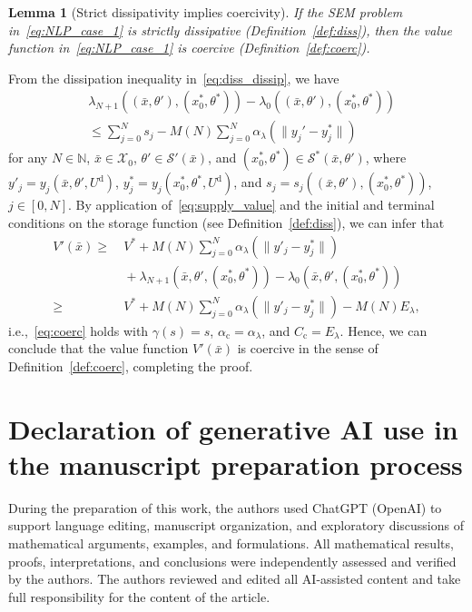 \documentclass[a4paper,fleqn]{cas-dc}
\newtheorem{lem}{Lemma}
\begin{document}
\begin{lem}[Strict dissipativity implies coercivity]\label{lem:diss2coerc}
	If the SEM problem in~\eqref{eq:NLP_case_1} is strictly dissipative (Definition~\ref{def:diss}), then the value function in~\eqref{eq:NLP_case_1} is coercive (Definition~\ref{def:coerc}).
\end{lem}
\begin{pf}
	From the dissipation inequality in~\eqref{eq:diss_dissip}, we have
	\begin{equation*}
		\begin{split}
			&\lambda_{N+1}((\bar{x},\theta'),(x^*_0,\theta^*)) -  \lambda_0((\bar{x},\theta'),(x^*_0,\theta^*)) \nonumber \\
			&\leq \sum_{j=0}^{N}s_j -  M(N)\sum_{j=0}^{N}\alpha_\lambda(\|y_j'-y_j^*\|)
		\end{split}
	\end{equation*}
	for any $N\in\mathbb{N}$, $\bar{x}\in\mathcal{X}_0$, $\theta'\in\mathcal{S}'(\bar{x})$, and $(x_0^*,\theta^*)\in\mathcal{S}^*(\bar{x},\theta')$, where $y'_j=y_j(\bar{x},\theta',U^\mathrm{d})$, $y^*_j=y_j(x_0^*,\theta^*,U^\mathrm{d})$, and $s_j = s_j((\bar{x},\theta'),(x_0^*,\theta^*))$, $j\in[0,N]$.
	By application of~\eqref{eq:supply_value} and the initial and terminal conditions on the storage function (see Definition~\ref{def:diss}), we can infer that
	\begin{align*}
		V'(\bar{x})
		\geq&\ V^* +  M(N)\sum_{j=0}^N \alpha_\lambda(\|y'_j-y^*_j\|) \\
		&\ +  \lambda_{N+1}(\bar{x},\theta',(x^*_0,\theta^*)) - \lambda_0(\bar{x},\theta',(x^*_0,\theta^*))\\
		\geq&\ V^* +  M(N)\sum_{j=0}^N \alpha_\lambda(\|y'_j-y^*_j\|) - M(N) E_\lambda,
	\end{align*}
	i.e.,~\eqref{eq:coerc} holds with $\gamma(s) = s$, $\alpha_\mathrm{c} = \alpha_\lambda$, and $C_\mathrm{c}=E_\lambda$. Hence, we can conclude that the value function $V'(\bar{x})$ is coercive in the sense of Definition~\ref{def:coerc}, completing the proof.
\end{pf}


\printcredits

\section*{Declaration of generative AI use in the manuscript preparation process}
During the preparation of this work, the authors used ChatGPT (OpenAI) to support language editing, manuscript organization, and exploratory discussions of mathematical arguments, examples, and formulations. All mathematical results, proofs, interpretations, and conclusions were independently assessed and verified by the authors. The authors reviewed and edited all AI-assisted content and take full responsibility for the content of the article.
\end{document}
